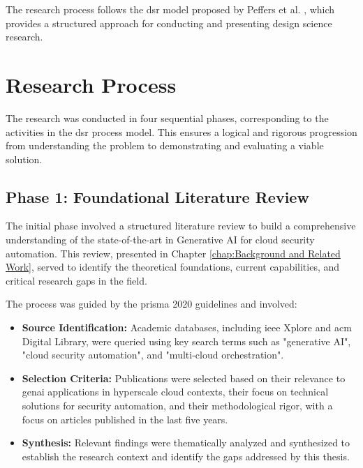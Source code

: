 The research process follows the \gls{dsr} model proposed by Peffers et al. \cite{peffers_design_2007}, which provides a structured approach for conducting and presenting design science research.

\section{Research Process}
\label{sec:research_process}
The research was conducted in four sequential phases, corresponding to the activities in the \gls{dsr} process model. This ensures a logical and rigorous progression from understanding the problem to demonstrating and evaluating a viable solution.

\subsection{Phase 1: Foundational Literature Review}
The initial phase involved a structured literature review to build a comprehensive understanding of the state-of-the-art in Generative AI for cloud security automation. This review, presented in Chapter \ref{chap:Background and Related Work}, served to identify the theoretical foundations, current capabilities, and critical research gaps in the field.

The process was guided by the \gls{prisma} 2020 guidelines \cite{page_prisma_2021-1} and involved:
\begin{itemize}
    \item \textbf{Source Identification:} Academic databases, including \gls{ieee} Xplore and \gls{acm} Digital Library, were queried using key search terms such as "generative AI", "cloud security automation", and "multi-cloud orchestration".
    \item \textbf{Selection Criteria:} Publications were selected based on their relevance to \gls{genai} applications in hyperscale cloud contexts, their focus on technical solutions for security automation, and their methodological rigor, with a focus on articles published in the last five years.
    \item \textbf{Synthesis:} Relevant findings were thematically analyzed and synthesized to establish the research context and identify the gaps addressed by this thesis.
\end{itemize}

